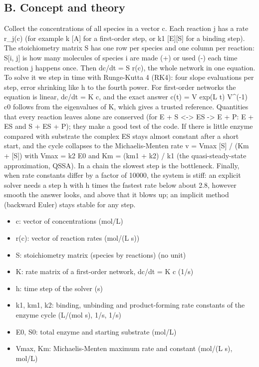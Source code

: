 \documentclass[11pt,a4paper]{article}
\begin{document}
\subsection*{B. Concept and theory}
Collect the concentrations of all species in a vector c. Each reaction j has a rate r\_j(c) (for example k [A] for a first-order step, or k1 [E][S] for a binding step). The stoichiometry matrix S has one row per species and one column per reaction: S[i, j] is how many molecules of species i are made (+) or used (-) each time reaction j happens once. Then dc/dt = S r(c), the whole network in one equation. To solve it we step in time with Runge-Kutta 4 (RK4): four slope evaluations per step, error shrinking like h to the fourth power. For first-order networks the equation is linear, dc/dt = K c, and the exact answer c(t) = V exp(L t) V\textasciicircum{}(-1) c0 follows from the eigenvalues of K, which gives a trusted reference. Quantities that every reaction leaves alone are conserved (for E + S \textless{}-\textgreater{} ES -\textgreater{} E + P: E + ES and S + ES + P); they make a good test of the code. If there is little enzyme compared with substrate the complex ES stays almost constant after a short start, and the cycle collapses to the Michaelis-Menten rate v = Vmax [S] / (Km + [S]) with Vmax = k2 E0 and Km = (km1 + k2) / k1 (the quasi-steady-state approximation, QSSA). In a chain the slowest step is the bottleneck. Finally, when rate constants differ by a factor of 10000, the system is stiff: an explicit solver needs a step h with h times the fastest rate below about 2.8, however smooth the answer looks, and above that it blows up; an implicit method (backward Euler) stays stable for any step.

\begin{itemize}[nosep]
\item c: vector of concentrations (mol/L)
\item r(c): vector of reaction rates (mol/(L s))
\item S: stoichiometry matrix (species by reactions) (no unit)
\item K: rate matrix of a first-order network, dc/dt = K c (1/s)
\item h: time step of the solver (s)
\item k1, km1, k2: binding, unbinding and product-forming rate constants of the enzyme cycle (L/(mol s), 1/s, 1/s)
\item E0, S0: total enzyme and starting substrate (mol/L)
\item Vmax, Km: Michaelis-Menten maximum rate and constant (mol/(L s), mol/L)
\end{itemize}
\end{document}
